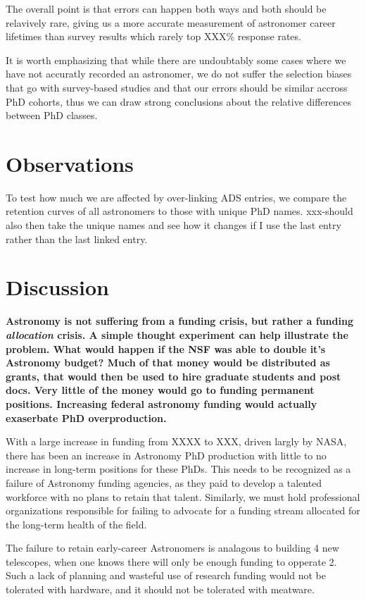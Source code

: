 \documentclass{emulateapj}
\begin{document}
The overall point is that errors can happen both ways and both should be relavively rare, giving us a more accurate measurement of astronomer career lifetimes than survey results which rarely top XXX\% response rates.

It is worth emphasizing that while there are undoubtably some cases where we have not accuratly recorded an astronomer, we do not suffer the selection biases that go with survey-based studies and that our errors should be similar accross PhD cohorts, thus we can draw strong conclusions about the relative differences between PhD classes.

\section{Observations}

To test how much we are affected by over-linking ADS entries, we compare the retention curves of all astronomers to those with unique PhD names.  xxx-should also then take the unique names and see how it changes if I use the last entry rather than the last linked entry.


\section{Discussion}

\bf{Astronomy is not suffering from a funding crisis, but rather a funding \emph{allocation} crisis.} A simple thought experiment can help illustrate the problem. What would happen if the NSF was able to double it's Astronomy budget? Much of that money would be distributed as grants, that would then be used to hire graduate students and post docs. Very little of the money would go to funding permanent positions. Increasing federal astronomy funding would actually exaserbate PhD overproduction. 

With a large increase in funding from XXXX to XXX, driven largly by NASA, there has been an increase in Astronomy PhD production with little to no increase in long-term positions for these PhDs.  This needs to be recognized as a failure of Astronomy funding agencies, as they paid to develop a talented workforce with no plans to retain that talent. Similarly, we must hold professional organizations responsible for failing to advocate for a funding stream allocated for the long-term health of the field.  

The failure to retain early-career Astronomers is analagous to building 4 new telescopes, when one knows there will only be enough funding to opperate 2.  Such a lack of planning and wasteful use of research funding would not be tolerated with hardware, and it should not be tolerated with meatware. 
\end{document}
